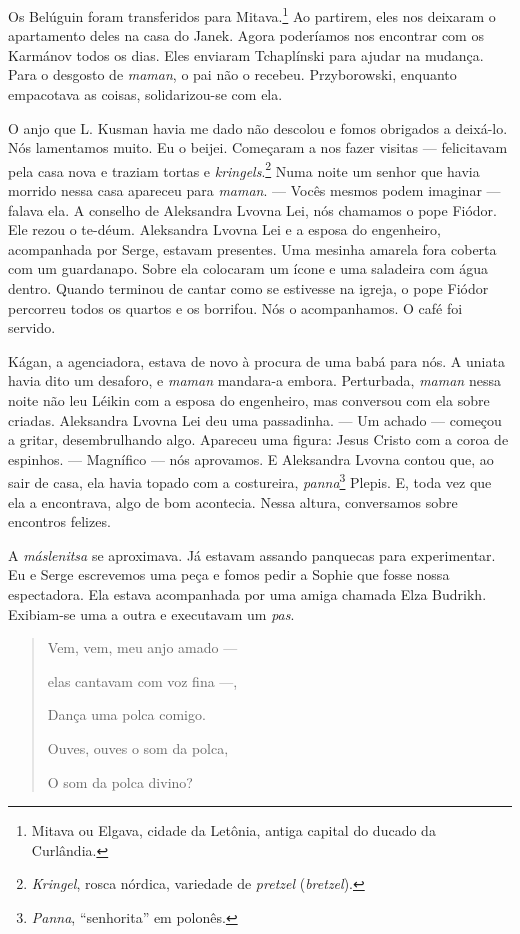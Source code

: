 Os Belúguin foram transferidos para Mitava.\footnote{Mitava ou Elgava,
  cidade da Letônia, antiga capital do ducado da Curlândia.} Ao
partirem, eles nos deixaram o apartamento deles na casa do Janek. Agora
poderíamos nos encontrar com os Karmánov todos os dias. Eles enviaram
Tchaplínski para ajudar na mudança. Para o desgosto de \emph{maman}, o
pai não o recebeu. Przyborowski, enquanto empacotava as coisas,
solidarizou-se com ela.

O anjo que L. Kusman havia me dado não descolou e fomos obrigados a
deixá-lo. Nós lamentamos muito. Eu o beijei. Começaram a nos fazer
visitas --- felicitavam pela casa nova e traziam tortas e
\emph{kringels}.\footnote{\emph{Kringel}, rosca nórdica, variedade de
  \emph{pretzel} (\emph{bretzel}).} Numa noite um senhor que
havia morrido nessa casa apareceu para \emph{maman}. --- Vocês mesmos
podem imaginar --- falava ela. A conselho de Aleksandra Lvovna Lei, nós
chamamos o pope Fiódor. Ele rezou o te-déum. Aleksandra Lvovna Lei e a
esposa do engenheiro, acompanhada por Serge, estavam presentes. Uma
mesinha amarela fora coberta com um guardanapo. Sobre ela colocaram um
ícone e uma saladeira com água dentro. Quando terminou de cantar como se
estivesse na igreja, o pope Fiódor percorreu todos os quartos e os
borrifou. Nós o acompanhamos. O café foi servido.

Kágan, a agenciadora, estava de novo à procura de uma babá para nós. A
uniata havia dito um desaforo, e \emph{maman} mandara-a embora.
Perturbada, \emph{maman} nessa noite não leu Léikin com a esposa do
engenheiro, mas conversou com ela sobre criadas. Aleksandra Lvovna Lei
deu uma passadinha. --- Um achado --- começou a gritar, desembrulhando
algo. Apareceu uma figura: Jesus Cristo com a coroa de espinhos. ---
Magnífico --- nós aprovamos. E Aleksandra Lvovna contou que, ao sair de
casa, ela havia topado com a costureira, \emph{panna}\footnote{\emph{Panna},
  ``senhorita'' em polonês.} Plepis. E, toda vez que ela a encontrava,
algo de bom acontecia. Nessa altura, conversamos sobre encontros
felizes.

A \emph{máslenitsa} se aproximava. Já estavam assando panquecas para
experimentar. Eu e Serge escrevemos uma peça e fomos pedir a Sophie que
fosse nossa espectadora. Ela estava acompanhada por uma amiga chamada
Elza Budrikh. Exibiam-se uma a outra e executavam um \emph{pas}.

\begin{quotation}
Vem, vem, meu anjo amado ---

elas cantavam com voz fina ---,

Dança uma polca comigo.

Ouves, ouves o som da polca,

O som da polca divino?
\end{quotation}

